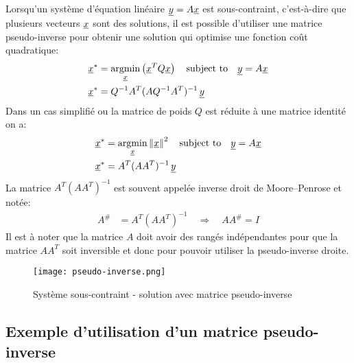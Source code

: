 Lorsqu'un système d'équation linéaire $\underline{y} = A \underline{x}$ est sous-contraint, c'est-à-dire que plusieurs vecteurs $\underline{x}$ sont des solutions, il est possible d'utiliser une matrice pseudo-inverse pour obtenir une solution qui optimise une fonction coût quadratique:
\begin{align}
\col{x}^* &= \operatornamewithlimits{argmin}\limits_{\col{x}} \left( \col{x}^T Q \col{x} \right) \quad \text{subject to} \quad \col{y} = A \col{x}  \\
\col{x}^* &= Q^{-1} A^T (A Q^{-1} A^T)^{-1} \, \col{y}
\end{align}
Dans un cas simplifié ou la matrice de poids $Q$ est réduite à une matrice identité on a:
\begin{align}
\col{x}^* &= \operatornamewithlimits{argmin}\limits_{\col{x}} \left\| \col{x} \right\|^2 \quad \text{subject to} \quad \col{y} = A \col{x}  \\
\col{x}^* &= A^T (A A^T)^{-1} \, \col{y}
\end{align}
La matrice $A^T (A A^T)^{-1}$ est souvent appelée inverse droit de Moore–Penrose et notée:
\begin{align}
A^{\#} &= A^T (A A^T)^{-1}  \quad \Rightarrow \quad A A^{\#} = I
\end{align}
Il est à noter que la matrice $A$ doit avoir des rangés indépendantes pour que la matrice $A A^T$ soit inversible et donc pour pouvoir utiliser la pseudo-inverse droite.

\begin{figure}[htbp]
	\centering
		\texttt{[image: pseudo-inverse.png]}
	\caption{Système sous-contraint - solution avec matrice pseudo-inverse}
	\label{fig:pseudo-inverse}
\end{figure}




\newpage
\subsection{Exemple d'utilisation d'un matrice pseudo-inverse}

